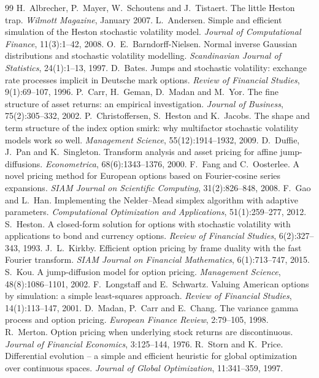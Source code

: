 \documentclass[11pt,a4paper]{article}
\theoremstyle{definition}
\theoremstyle{remark}
\begin{document}
\begin{thebibliography}{99}\small
{} H.~Albrecher, P.~Mayer, W.~Schoutens and J.~Tistaert. The little Heston trap. \emph{Wilmott Magazine}, January 2007.
 L.~Andersen. Simple and efficient simulation of the Heston stochastic volatility model. \emph{Journal of
  Computational Finance}, 11(3):1--42, 2008.
 O.~E.~Barndorff-Nielsen. Normal inverse Gaussian distributions and stochastic volatility modelling.
  \emph{Scandinavian Journal of Statistics}, 24(1):1--13, 1997.
 D.~Bates. Jumps and stochastic volatility: exchange rate processes implicit in Deutsche mark options.
  \emph{Review of Financial Studies}, 9(1):69--107, 1996.
 P.~Carr, H.~Geman, D.~Madan and M.~Yor. The fine structure of asset returns: an empirical investigation.
  \emph{Journal of Business}, 75(2):305--332, 2002.
 P.~Christoffersen, S.~Heston and K.~Jacobs. The shape and term structure of the index option smirk: why multifactor
  stochastic volatility models work so well. \emph{Management Science}, 55(12):1914--1932, 2009.
 D.~Duffie, J.~Pan and K.~Singleton. Transform analysis and asset pricing for affine jump-diffusions.
  \emph{Econometrica}, 68(6):1343--1376, 2000.
 F.~Fang and C.~Oosterlee. A novel pricing method for European options based on Fourier-cosine series expansions.
  \emph{SIAM Journal on Scientific Computing}, 31(2):826--848, 2008.
 F.~Gao and L.~Han. Implementing the Nelder--Mead simplex algorithm with adaptive parameters.
  \emph{Computational Optimization and Applications}, 51(1):259--277, 2012.
 S.~Heston. A closed-form solution for options with stochastic volatility with applications to bond and
  currency options. \emph{Review of Financial Studies}, 6(2):327--343, 1993.
 J.~L.~Kirkby. Efficient option pricing by frame duality with the fast Fourier transform. \emph{SIAM Journal on
  Financial Mathematics}, 6(1):713--747, 2015.
 S.~Kou. A jump-diffusion model for option pricing. \emph{Management Science}, 48(8):1086--1101, 2002.
 F.~Longstaff and E.~Schwartz. Valuing American options by simulation: a simple least-squares approach.
  \emph{Review of Financial Studies}, 14(1):113--147, 2001.
 D.~Madan, P.~Carr and E.~Chang. The variance gamma process and option pricing. \emph{European Finance Review},
  2:79--105, 1998.
 R.~Merton. Option pricing when underlying stock returns are discontinuous. \emph{Journal of Financial Economics},
  3:125--144, 1976.
 R.~Storn and K.~Price. Differential evolution -- a simple and efficient heuristic for global optimization over
  continuous spaces. \emph{Journal of Global Optimization}, 11:341--359, 1997.
\end{thebibliography}
\end{document}
